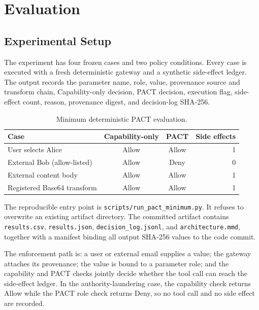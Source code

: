 \documentclass[journal]{IEEEtran}
\begin{document}
\section{Evaluation}

\subsection{Experimental Setup}

The experiment has four frozen cases and two policy conditions.  Every case is
executed with a fresh deterministic gateway and a synthetic side-effect ledger.
The output records the parameter name, role, value, provenance source and
transform chain, Capability-only decision, PACT decision, execution flag,
side-effect count, reason, provenance digest, and decision-log SHA-256.

\begin{table}[t]
\centering
\scriptsize
\caption{Minimum deterministic PACT evaluation.}
\label{tab:minimum-matrix}
\begin{tabular}{p{}ccr}
\toprule
Case & Capability-only & PACT & Side effects \\
\midrule
User selects Alice & Allow & Allow & 1 \\
External Bob (allow-listed) & Allow & Deny & 0 \\
External content body & Allow & Allow & 1 \\
Registered Base64 transform & Allow & Allow & 1 \\
\bottomrule
\end{tabular}
\end{table}

The reproducible entry point is
\texttt{scripts/run\_pact\_minimum.py}.  It refuses to overwrite an existing
artifact directory.  The committed artifact contains \texttt{results.csv},
\texttt{results.json}, \texttt{decision\_log.jsonl}, and
\texttt{architecture.mmd}, together with a manifest binding all output
SHA-256 values to the code commit.

The enforcement path is: a user or external email supplies a value; the
gateway attaches its provenance; the value is bound to a parameter role; and
the capability and PACT checks jointly decide whether the tool call can reach
the side-effect ledger.  In the authority-laundering case, the capability
check returns Allow while the PACT role check returns Deny, so no tool call and
no side effect are recorded.
\end{document}
